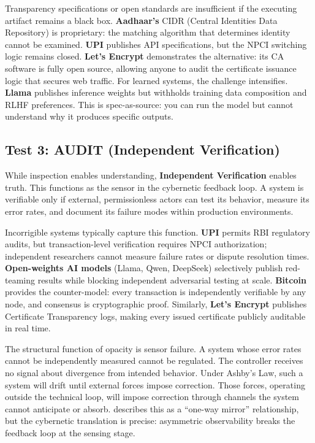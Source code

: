 \documentclass{article}
\begin{document}
Transparency specifications or open standards are insufficient if the executing artifact remains a black box. \textbf{Aadhaar's} CIDR (Central Identities Data Repository) is proprietary: the matching algorithm that determines identity cannot be examined. \textbf{UPI} publishes API specifications, but the NPCI switching logic remains closed. \textbf{Let's Encrypt} demonstrates the alternative: its CA software is fully open source, allowing anyone to audit the certificate issuance logic that secures web traffic. For learned systems, the challenge intensifies. \textbf{Llama} publishes inference weights but withholds training data composition and RLHF preferences. This is spec-as-source: you can run the model but cannot understand why it produces specific outputs.

\subsection{Test 3: AUDIT (Independent Verification)}

While inspection enables understanding, \textbf{Independent Verification} enables truth. This functions as the sensor in the cybernetic feedback loop. A system is verifiable only if external, permissionless actors can test its behavior, measure its error rates, and document its failure modes within production environments.

Incorrigible systems typically capture this function. \textbf{UPI} permits RBI regulatory audits, but transaction-level verification requires NPCI authorization; independent researchers cannot measure failure rates or dispute resolution times. \textbf{Open-weights AI models} (Llama, Qwen, DeepSeek) selectively publish red-teaming results while blocking independent adversarial testing at scale. \textbf{Bitcoin} provides the counter-model: every transaction is independently verifiable by any node, and consensus is cryptographic proof. Similarly, \textbf{Let's Encrypt} publishes Certificate Transparency logs, making every issued certificate publicly auditable in real time.

The structural function of opacity is sensor failure. A system whose error rates cannot be independently measured cannot be regulated. The controller receives no signal about divergence from intended behavior. Under Ashby's Law, such a system will drift until external forces impose correction. Those forces, operating outside the technical loop, will impose correction through channels the system cannot anticipate or absorb. \citet{pasquale2015} describes this as a ``one-way mirror'' relationship, but the cybernetic translation is precise: asymmetric observability breaks the feedback loop at the sensing stage.
\end{document}
